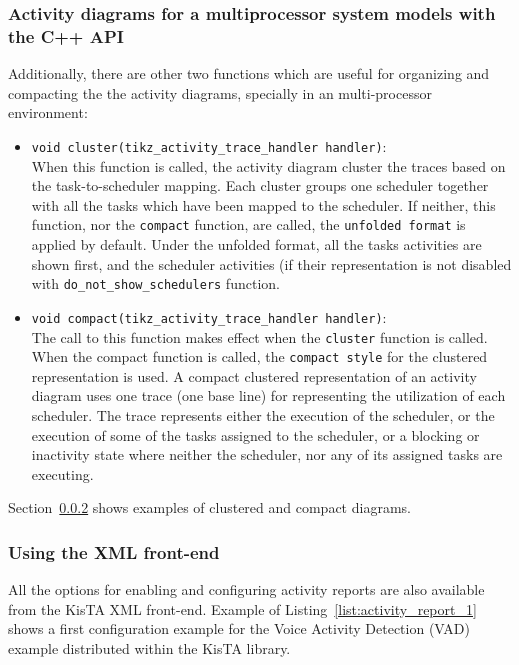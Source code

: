 \subsubsection{Activity diagrams for a multiprocessor system models with the C++ API}
\label{sec:activity_multiproc_c_api}

Additionally, there are other two functions which are useful for organizing and compacting the 
the activity diagrams, specially in an multi-processor environment:

\begin{itemize}
\item \texttt{void cluster(tikz\_activity\_trace\_handler handler)}:\\
When this function is called, the activity diagram cluster the traces
based on the task-to-scheduler mapping.
Each cluster groups one scheduler together with all the tasks which have
been mapped to the scheduler.
If neither, this function, nor the \texttt{compact} function, are called,
the \texttt{unfolded format} is applied by default.
Under the unfolded format, all the tasks activities are shown first,
and the scheduler activities (if their representation is not disabled
with \texttt{do\_not\_show\_schedulers} function.

\item \texttt{void compact(tikz\_activity\_trace\_handler handler)}:\\
The call to this function makes effect when the \texttt{cluster} function is called.
When the compact function is called, the \texttt{compact style} for the 
clustered representation is used.
A compact clustered representation of an activity diagram uses
one trace (one base line) for representing the utilization of each scheduler.
The trace represents either the execution of the scheduler, or the execution
of some of the tasks assigned to the scheduler, or a blocking or inactivity
state where neither the scheduler, nor any of its assigned tasks are executing.
\end{itemize}

Section~\ref{sec:activity_xml} shows examples of clustered and compact diagrams.

\subsubsection{Using the XML front-end}
\label{sec:activity_xml}

All the options for enabling and configuring activity reports are also available
from the KisTA XML front-end.
Example of Listing~\ref{list:activity_report_1} shows a first configuration example
for the Voice Activity Detection (VAD) example distributed within the KisTA library.

